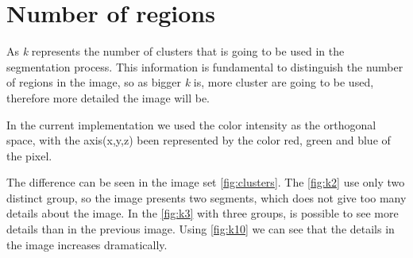 \documentclass{article}
\begin{document}
\section{Number of regions}

As \emph{k} represents the number of clusters that is going to be used in the segmentation process. 
This information is fundamental to distinguish the number of regions in the image, so as bigger \emph{k} is, more cluster are going to be used, therefore more detailed the image will be.  

In the current implementation we used the color intensity as the orthogonal space, with the axis(x,y,z) been represented by the color red, green and blue of the pixel.

The difference can be seen in the image set \ref{fig:clusters}. The \ref{fig:k2} use only two distinct group, so the image presents two segments, which does not give too many details about the image.  In the \ref{fig:k3} with three groups, is possible to see more details than in the previous image. Using \ref{fig:k10} we can see that the details in the image increases dramatically.
\end{document}
